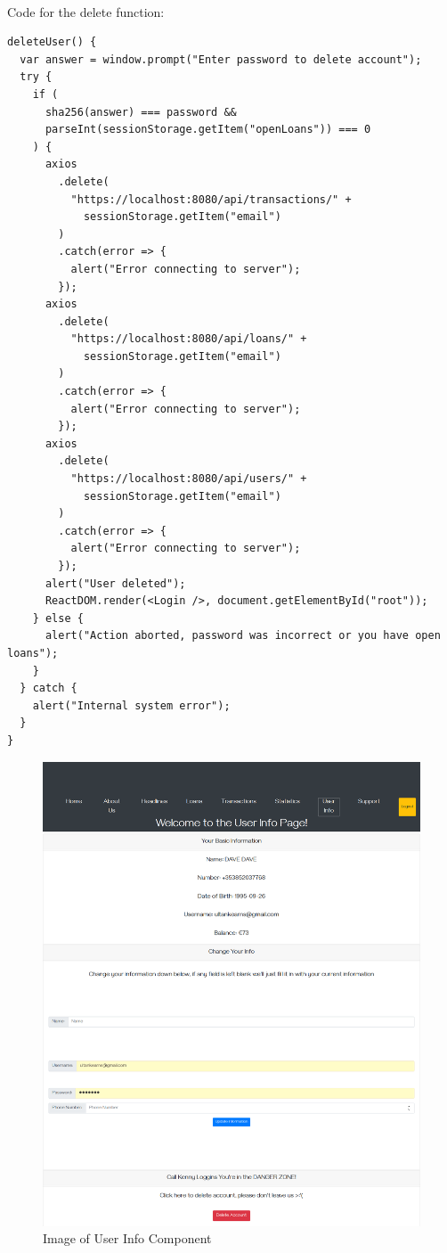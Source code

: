 \\
Code for the delete function:
\begin{verbatim}
deleteUser() {
  var answer = window.prompt("Enter password to delete account");
  try {
    if (
      sha256(answer) === password &&
      parseInt(sessionStorage.getItem("openLoans")) === 0
    ) {
      axios
        .delete(
          "https://localhost:8080/api/transactions/" +
            sessionStorage.getItem("email")
        )
        .catch(error => {
          alert("Error connecting to server");
        });
      axios
        .delete(
          "https://localhost:8080/api/loans/" +
            sessionStorage.getItem("email")
        )
        .catch(error => {
          alert("Error connecting to server");
        });
      axios
        .delete(
          "https://localhost:8080/api/users/" +
            sessionStorage.getItem("email")
        )
        .catch(error => {
          alert("Error connecting to server");
        });
      alert("User deleted");
      ReactDOM.render(<Login />, document.getElementById("root"));
    } else {
      alert("Action aborted, password was incorrect or you have open loans");
    }
  } catch {
    alert("Internal system error");
  }
}
\end{verbatim}
\begin{figure}[H]
\includegraphics[width=\textwidth]{img/userinfocomponent.png}
\caption{Image of User Info Component}
\label{fig:Image of user info component}
\end{figure}
